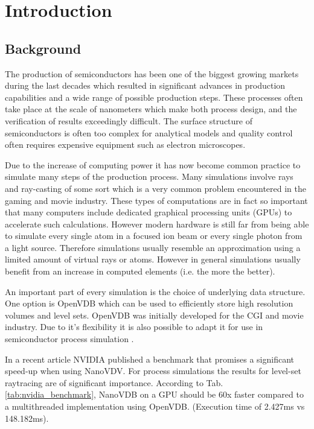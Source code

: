\section{Introduction}
\subsection{Background}
The production of semiconductors has been one of the biggest growing markets during the last decades which resulted in significant advances in production capabilities and a wide range of possible production steps.
These processes often take place at the scale of nanometers which make both process design, and the verification of results exceedingly difficult.
The surface structure of semiconductors is often too complex for analytical models and quality control often requires expensive equipment such as electron microscopes.

Due to the increase of computing power it has now become common practice to simulate many steps of the production process.
Many simulations involve rays and ray-casting of some sort which is a very common problem encountered in the gaming and movie industry.
These types of computations are in fact so important that many computers include dedicated graphical processing units (GPUs) to accelerate such calculations.
However modern hardware is still far from being able to simulate every single atom in a focused ion beam or every single photon from a light source.
Therefore simulations usually resemble an approximation using a limited amount of virtual rays or atoms.
However in general simulations usually benefit from an increase in computed elements (i.e. the more the better).

An important part of every simulation is the choice of underlying data structure.
One option is OpenVDB which can be used to efficiently store high resolution volumes and level sets. \cite{openvdb}
OpenVDB was initially developed for the CGI and movie industry. Due to it's flexibility it is also possible to adapt it for use in semiconductor process simulation \cite{manstetten2018efficient}.

In a recent article  NVIDIA published a benchmark that promises a significant speed-up when using NanoVDV.
For process simulations the results for level-set raytracing are of significant importance.
According to Tab. \ref{tab:nvidia_benchmark}, NanoVDB on a GPU should be 60x faster compared to a multithreaded implementation using OpenVDB. (Execution time of 2.427ms vs 148.182ms).


